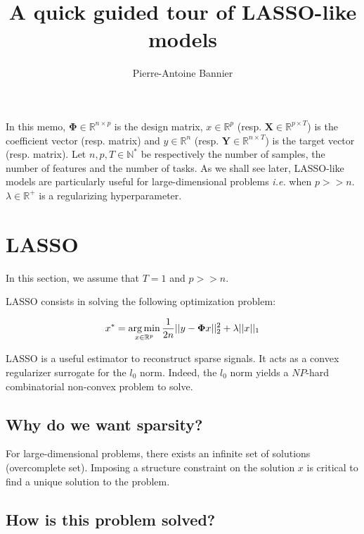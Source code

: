 \documentclass[a4paper,10pt]{article}
\author{Pierre-Antoine Bannier}
\title{A quick guided tour of LASSO-like models}
\theoremstyle{definition}
\begin{document}
\maketitle

\vskip 0.3in

In this memo, $\mathbf{\Phi} \in \mathbb{R}^{n \times p}$ is the design matrix, $x \in \mathbb{R}^{p}$ (resp. $\mathbf{X} \in \mathbb{R}^{p \times T}$) is the coefficient vector (resp. matrix) and $y \in \mathbb{R}^n$
(resp. $\mathbf{Y} \in \mathbb{R}^{n \times T}$) is the target vector (resp. matrix). Let $n, p, T \in \mathbb{N}^*$ be respectively the number of samples, the number of features and the number of tasks. As we shall see later, LASSO-like models
are particularly useful for large-dimensional problems \textit{i.e.} when $p >> n$. $\lambda \in \mathbb{R}^+$ is a regularizing hyperparameter.

\section{LASSO}
\label{section_1}

In this section, we assume that $T = 1$ and $p >> n$.

\vskip 0.2in

LASSO consists in solving the following optimization problem:

\begin{equation*}
    x^* = \operatorname*{arg\,min}_{x \in \mathbb{R}^{p}} \frac{1}{2n}\lvert\lvert y - \mathbf{\Phi} x \rvert\rvert_2^2 + \lambda \lvert\lvert x \rvert\rvert_{1}
\end{equation*}

\vskip 0.1in

LASSO is a useful estimator to reconstruct sparse signals. It acts as a convex regularizer surrogate for the $l_0$ norm. Indeed, the
$l_0$ norm yields a $NP$-hard combinatorial non-convex problem to solve. \\

\subsection*{Why do we want sparsity?}

For large-dimensional problems, there exists an infinite set of solutions (overcomplete set).
Imposing a structure constraint on the solution $x$ is critical to find a unique solution to the problem.

\subsection*{How is this problem solved?}
\end{document}
